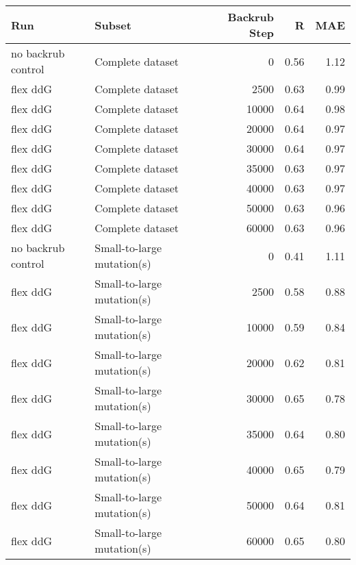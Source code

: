 \begin{table}
\begin{tabular}{llrrr}
\toprule
                Run &                               Subset &  Backrub Step &    R &  MAE \\
\midrule
 no backrub control &                     Complete dataset &             0 & 0.56 & 1.12 \\
           flex ddG &                     Complete dataset &          2500 & 0.63 & 0.99 \\
           flex ddG &                     Complete dataset &         10000 & 0.64 & 0.98 \\
           flex ddG &                     Complete dataset &         20000 & 0.64 & 0.97 \\
           flex ddG &                     Complete dataset &         30000 & 0.64 & 0.97 \\
           flex ddG &                     Complete dataset &         35000 & 0.63 & 0.97 \\
           flex ddG &                     Complete dataset &         40000 & 0.63 & 0.97 \\
           flex ddG &                     Complete dataset &         50000 & 0.63 & 0.96 \\
           flex ddG &                     Complete dataset &         60000 & 0.63 & 0.96 \\
 no backrub control &           Small-to-large mutation(s) &             0 & 0.41 & 1.11 \\
           flex ddG &           Small-to-large mutation(s) &          2500 & 0.58 & 0.88 \\
           flex ddG &           Small-to-large mutation(s) &         10000 & 0.59 & 0.84 \\
           flex ddG &           Small-to-large mutation(s) &         20000 & 0.62 & 0.81 \\
           flex ddG &           Small-to-large mutation(s) &         30000 & 0.65 & 0.78 \\
           flex ddG &           Small-to-large mutation(s) &         35000 & 0.64 & 0.80 \\
           flex ddG &           Small-to-large mutation(s) &         40000 & 0.65 & 0.79 \\
           flex ddG &           Small-to-large mutation(s) &         50000 & 0.64 & 0.81 \\
           flex ddG &           Small-to-large mutation(s) &         60000 & 0.65 & 0.80 \\

\end{tabular}
\end{table}
